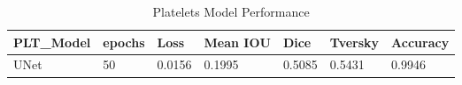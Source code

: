 \begin{table}
\centering
\begin{tabular}{|l|l|l|l|l|l|l|} 
\hline
\textbf{PLT\_Model} & \textbf{epochs} & \textbf{Loss}    & \textbf{Mean IOU} & \textbf{Dice}   & \textbf{Tversky} & \textbf{Accuracy}  \\ 
\hline
UNet       & 50 & 0.0156 & 0.1995   & 0.5085 & 0.5431  & 0.9946    \\
\hline
\end{tabular}
\caption{Platelets Model Performance}
\label{table:PLT_DOUNET_TRAIN}
\end{table}